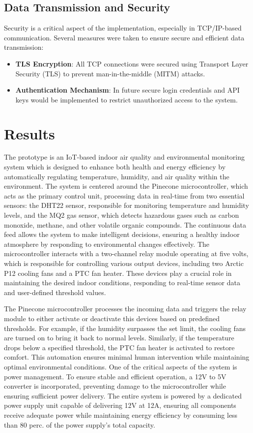 \documentclass[a4paper]{scrartcl}
\begin{document}
\subsection{Data Transmission and Security}
Security is a critical aspect of the implementation, especially in TCP/IP-based communication. Several measures were taken to ensure secure and efficient data transmission:
\begin{itemize}
    \item \textbf{TLS Encryption}: All TCP connections were secured using Transport Layer Security (TLS) to prevent man-in-the-middle (MITM) attacks.
    \item \textbf{Authentication Mechanism}: In future secure login credentials and API keys would be implemented to restrict unauthorized access to the system.
\end{itemize}






\section{Results}
The prototype is an IoT-based indoor air quality and environmental monitoring system which is designed to enhance both health and energy efficiency by automatically regulating temperature, humidity, and air quality within the environment. The system is centered around the Pinecone microcontroller, which acts as the primary control unit, processing data in real-time from two essential sensors: the DHT22 sensor, responsible for monitoring temperature and humidity levels, and the MQ2 gas sensor, which detects hazardous gases such as carbon monoxide, methane, and other volatile organic compounds. The continuous data feed allows the system to make intelligent decisions, ensuring a healthy indoor atmosphere by responding to environmental changes effectively. The microcontroller interacts with a two-channel relay module operating at five volts, which is responsible for controlling various output devices, including two Arctic P12 cooling fans and a PTC fan heater. These devices play a crucial role in maintaining the desired indoor conditions, responding to real-time sensor data and user-defined threshold values.

The Pinecone microcontroller processes the incoming data and triggers the relay module to either activate or deactivate this devices based on predefined thresholds. For example, if the humidity surpasses the set limit, the cooling fans are turned on to bring it back to normal levels. Similarly, if the temperature drops below a specified threshold, the PTC fan heater is activated to restore comfort. This automation ensures minimal human intervention while maintaining optimal environmental conditions. One of the critical aspects of the system is power management. To ensure stable and efficient operation, a 12V to 5V converter is incorporated, preventing damage to the microcontroller while ensuring sufficient power delivery. The entire system is powered by a dedicated power supply unit capable of delivering 12V at 12A, ensuring all components receive adequate power while maintaining energy efficiency by consuming less than 80 perc. of the power supply’s total capacity.
\end{document}
